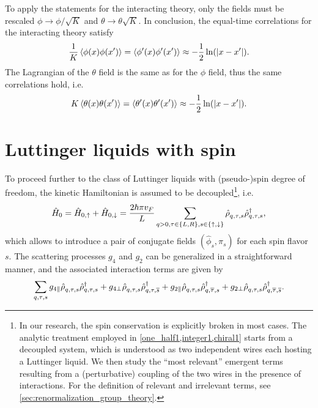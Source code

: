 To apply the statements for the interacting theory, only the fields must be rescaled $\phi\rightarrow\phi/\sqrt K$ and $\theta\rightarrow\theta\sqrt K$.
In conclusion, the equal-time correlations for the interacting theory satisfy
\begin{align}
    \frac1K\braket{\phi(x)\phi(x')} = \braket{\phi'(x)\phi'(x')} \approx -\frac12\ln(|x-x'|).
    \label{eq:greens_1}
\end{align}
The Lagrangian of the $\theta$ field is the same as for the $\phi$ field, thus the same correlations hold, i.e.
\begin{align}
    K\braket{\theta(x)\theta(x')} = \braket{\theta'(x)\theta'(x')} \approx -\frac12\ln(|x-x'|).
    \label{eq:greens_2}
\end{align}
%
%
\section{Luttinger liquids with spin}
\label{sec:LL_with_spin}
To proceed further to the class of Luttinger liquids with (pseudo-)spin degree of freedom, the kinetic Hamiltonian is assumed to be decoupled\footnote{In our research, the spin conservation is explicitly broken in most cases. The analytic treatment employed in \cref{one_half1,integer1,chiral1} starts from a decoupled system, which is understood as two independent wires each hosting a Luttinger liquid. We then study the ``most relevant'' emergent terms resulting from a (perturbative) coupling of the two wires in the presence of interactions. For the definition of relevant and irrelevant terms, see \cref{sec:renormalization_group_theory}.}, i.e.
\begin{align}
    \hat H_0 = \hat H_{0,\uparrow}+\hat H_{0,\downarrow}
    = \frac{2\hbar\pi v_F}L\sum_{q>0,\tau\in\{L,R\},s\in\{\uparrow,\downarrow\}}\hat\rho^\pdag_{q,\tau,s}\hat\rho^\dag_{q,\tau,s},
\end{align}
which allows to introduce a pair of conjugate fields $(\hat \phi_s,\hat \pi_s)$ for each spin flavor $s$.
The scattering processes $g_4$ and $g_2$ can be generalized in a straightforward manner, and the associated interaction terms are given by
\begin{align}
  \sum_{q,\tau,s}
  g_{4\parallel}\hat\rho^\pdag_{q,\tau,s}\hat\rho^\dag_{q,\tau,s}
  +
  g_{4\perp}\hat\rho^\pdag_{q,\tau,s}\hat\rho^\dag_{q,\tau,\overline s}
  +
  g_{2\parallel}\hat\rho^\pdag_{q,\tau,s}\hat\rho^\dag_{q,\overline\tau,s}
  +
  g_{2\perp}\hat\rho^\pdag_{q,\tau,s}\hat\rho^\dag_{q,\overline\tau,\overline s}.
\end{align}
